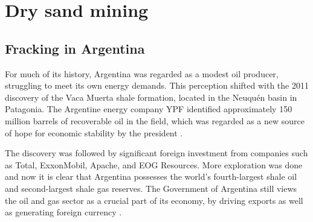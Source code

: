 \chapter{Dry sand mining}



\section{Fracking in Argentina}
For much of its history, Argentina was regarded as a modest oil producer, struggling to meet its own energy demands. This perception shifted with the 2011 discovery of the Vaca Muerta shale formation, located in the Neuquén basin in Patagonia. The Argentine energy company YPF identified approximately 150 million barrels of recoverable oil in the field, which was regarded as a new source of hope for economic stability by the president \autocite{kraussArgentinaHopesBig2011}.

The discovery was followed by significant foreign investment from companies such as Total, ExxonMobil, Apache, and EOG Resources. More exploration was done and now it is clear that Argentina possesses the world’s fourth-largest shale oil and second-largest shale gas reserves. The Government of Argentina still views the oil and gas sector as a crucial part of its economy, by driving exports as well as generating foreign currency \autocite{internationaltradeadministrationArgentinaCountryCommercial2025}.

